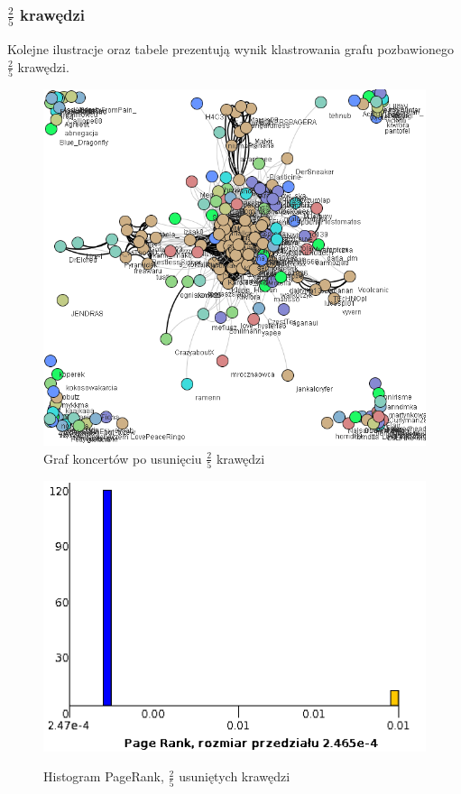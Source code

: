 \documentclass[10pt,a4paper]{article}
\begin{document}
\subsubsection {$\frac{2}{5}$ krawędzi}
  Kolejne ilustracje oraz tabele prezentują wynik klastrowania grafu pozbawionego  $\frac{2}{5}$  krawędzi.
\begin{figure}[H]
\centering
\caption{Graf koncertów po usunięciu $\frac{2}{5}$ krawędzi}
\includegraphics[scale=0.5]{wyniki/final200Events/2200events.png}
\end{figure}

\begin{figure}[H]
\centering
\caption{Histogram PageRank, $\frac{2}{5}$ usuniętych krawędzi}
\includegraphics[scale=0.6]{wyniki/final200Events/2200eventsPRHist.png}
\label{fig:1200lovedPRHist}
\end{figure}
\end{document}
